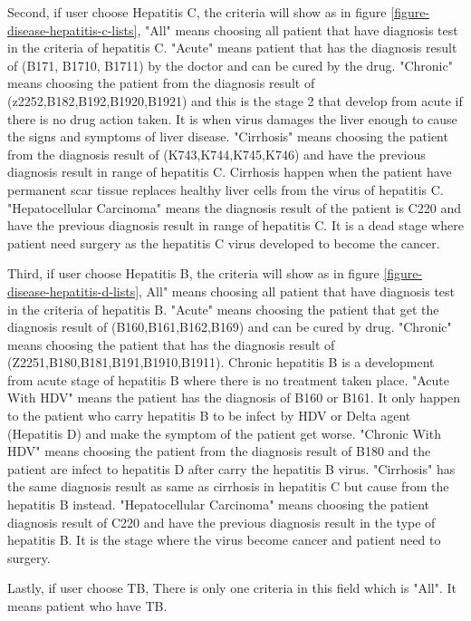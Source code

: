     Second, if user choose Hepatitis C, the criteria will show as in figure \ref{figure-disease-hepatitis-c-lists}, "All" means choosing all patient that have diagnosis test in the criteria of hepatitis C. "Acute" means patient that has the diagnosis result of (B171, B1710, B1711) by the doctor and can be cured by the drug. "Chronic" means choosing the patient from the diagnosis result of (z2252,B182,B192,B1920,B1921) and this is the stage 2 that develop from acute if there is no drug action taken. It is when virus damages the liver enough to cause the signs and symptoms of liver disease. "Cirrhosis" means choosing the patient from the diagnosis result of (K743,K744,K745,K746) and have the previous diagnosis result in range of hepatitis C. Cirrhosis happen when the patient have permanent scar tissue replaces healthy liver cells from the virus of hepatitis C. "Hepatocellular Carcinoma" means the diagnosis result of the patient is C220 and have the previous diagnosis result in range of hepatitis C. It is a dead stage where patient need surgery as the hepatitis C virus developed to become the cancer.
    
    Third, if user choose Hepatitis B, the criteria will show as in figure \ref{figure-disease-hepatitis-d-lists}, All" means choosing all patient that have diagnosis test in the criteria of hepatitis B. "Acute" means choosing the patient that get the diagnosis result of (B160,B161,B162,B169) and can be cured by drug. "Chronic" means choosing the patient that has the diagnosis result of (Z2251,B180,B181,B191,B1910,B1911). Chronic hepatitis B is a development from acute stage of hepatitis B where there is no treatment taken place. "Acute With HDV" means the patient has the diagnosis of B160 or B161. It only happen to the patient who carry hepatitis B to be infect by HDV or Delta agent (Hepatitis D) and make the symptom of the patient get worse. "Chronic With HDV" means choosing the patient from the diagnosis result of B180 and the patient are infect to hepatitis D after carry the hepatitis B virus. "Cirrhosis" has the same diagnosis result as same as cirrhosis in hepatitis C but cause from the hepatitis B instead. "Hepatocellular Carcinoma" means choosing the patient diagnosis result of C220 and have the previous diagnosis result in the type of hepatitis B. It is the stage where the virus become cancer and patient need to surgery.
    
    Lastly, if user choose TB, There is only one criteria in this field which is "All". It means patient who have TB.
    
